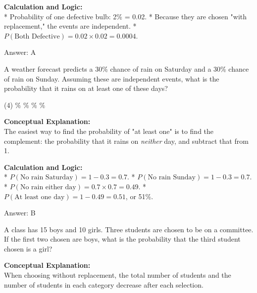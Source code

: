 \documentclass[11pt,paper=a4,answers]{exam}
\begin{document}
\begin{questions}
\begin{solution}
\textbf{Calculation and Logic:} \\
* Probability of one defective bulb: 2\% = 0.02.
* Because they are chosen "with replacement," the events are independent.
* $P(\text{Both Defective}) = 0.02 \times 0.02 = 0.0004$.

\vspace{30pt}

Answer: \colorbox{yellow!100}{A}
\end{solution}

\vspace{60pt}

\question
A weather forecast predicts a 30\% chance of rain on Saturday and a 30\% chance of rain on Sunday. Assuming these are independent events, what is the probability that it rains on at least one of these days?
\begin{tasks}(4)
    \%
    \%
    \%
    \%
\end{tasks}

\begin{solution}
\textbf{Conceptual Explanation:} \\
The easiest way to find the probability of "at least one" is to find the complement: the probability that it rains on \textit{neither} day, and subtract that from 1.

\vspace{30pt}

\textbf{Calculation and Logic:} \\
* $P(\text{No rain Saturday}) = 1 - 0.3 = 0.7$.
* $P(\text{No rain Sunday}) = 1 - 0.3 = 0.7$.
* $P(\text{No rain either day}) = 0.7 \times 0.7 = 0.49$.
* $P(\text{At least one day}) = 1 - 0.49 = 0.51$, or 51\%.

\vspace{30pt}

Answer: \colorbox{yellow!100}{B}
\end{solution}

\vspace{60pt}

\question
A class has 15 boys and 10 girls. Three students are chosen to be on a committee. If the first two chosen are boys, what is the probability that the third student chosen is a girl?

\begin{solution}
\textbf{Conceptual Explanation:} \\
When choosing without replacement, the total number of students and the number of students in each category decrease after each selection.


\end{solution}
\end{questions}
\end{document}
